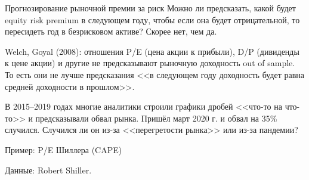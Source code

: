 \documentclass{beamer}
\begin{document}
\begin{frame}{Прогнозирование рыночной премии за риск}
\justify
Можно ли предсказать, какой будет equity risk premium в следующем году, чтобы если она будет отрицательной, то пересидеть год в безрисковом активе? Скорее нет, чем да.

\justify
Welch, Goyal (2008): отношения P/E (цена акции к прибыли), D/P (дивиденды к цене акции) и другие не предсказывают рыночную доходность out of sample. То есть они не лучше предсказания <<в следующем году доходность будет равна средней доходности в прошлом>>.

\justify
В 2015--2019 годах многие аналитики строили графики дробей <<что-то на что-то>> и предсказывали обвал рынка. Пришёл март 2020 г. и обвал на 35\% случился. Случился ли он из-за <<перегретости рынка>> или из-за пандемии?
\end{frame}



\begin{frame}{Пример: P/E Шиллера (CAPE)}
\centering
{}
{\scriptsize Данные: Robert Shiller.}
\end{frame}
\end{document}
